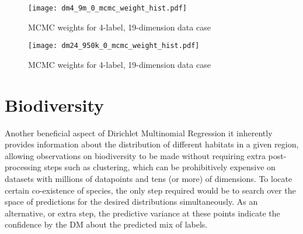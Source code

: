 
\begin{figure}[H]
    \centerline{\texttt{[image: dm4\_9m\_0\_mcmc\_weight\_hist.pdf]}}
    \caption{MCMC weights for 4-label, 19-dimension data case }
    \label{fig:4l-mcmc_weights}
\end{figure}

\begin{figure}[H]
    \centerline{\texttt{[image: dm24\_950k\_0\_mcmc\_weight\_hist.pdf]}}
    \caption{MCMC weights for 4-label, 19-dimension data case }
    \label{fig:24l-mcmc_weights}
\end{figure}

\section{Biodiversity}

Another beneficial aspect of Dirichlet Multinomial Regression it inherently provides information about the distribution of different habitats in a given region, allowing observations on biodiversity to be made without requiring extra post-processing steps such as clustering, which can be prohibitively expensive on datasets with millions of datapoints and tens (or more) of dimensions. To locate certain co-existence of species, the only step required would be to search over the space of predictions for the desired distributions simultaneously. As an alternative, or extra step, the predictive variance at these points indicate the confidence by the DM about the predicted mix of labels. 



